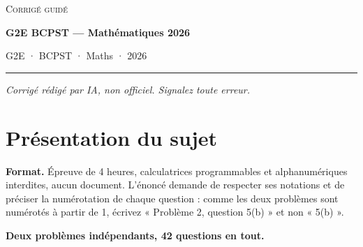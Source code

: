 \documentclass[11pt,a4paper]{article}
\begin{document}
\thispagestyle{plain}
\begin{center}
  {\small\scshape Corrigé guidé}\par\smallskip
  {\LARGE\bfseries G2E BCPST — Mathématiques 2026\par}\medskip
  {\large G2E · BCPST · Maths · 2026\par}
\end{center}
\vspace{2pt}\hrule\vspace{8pt}

\emph{Corrigé rédigé par IA, non officiel. Signalez toute erreur.}

\hypertarget{pruxe9sentation-du-sujet}{%
\section{Présentation du sujet}\label{pruxe9sentation-du-sujet}}

\textbf{Format.} Épreuve de 4 heures, calculatrices programmables et alphanumériques interdites, aucun document. L'énoncé demande de respecter ses notations et de préciser la numérotation de chaque question : comme les deux problèmes sont numérotés à partir de 1, écrivez « Problème 2, question 5(b) » et non « 5(b) ».

\textbf{Deux problèmes indépendants, 42 questions en tout.}
\end{document}
